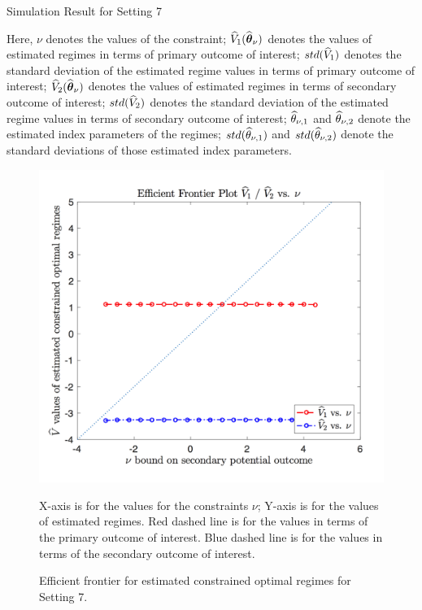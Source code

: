 \begin{table}[!htbp]
	\caption {Simulation Result for Setting 7}
	\centering
	{\tt
		
	}
	\justify
	Here, $\nu$ denotes the values of the constraint; $\widehat{V}_1(\widehat{\boldsymbol{\theta}}_{\nu})$ denotes the values of estimated regimes in terms of primary outcome of interest; $std(\widehat{V}_1)$ denotes the standard deviation of the estimated regime values in terms of primary outcome of interest; $\widehat{V}_2(\widehat{\boldsymbol{\theta}}_{\nu})$ denotes the values of estimated regimes in terms of secondary outcome of interest; $std(\widehat{V}_2)$ denotes the standard deviation of the estimated regime values in terms of secondary outcome of interest; $\widehat{\theta}_{\nu,1}$ and $\widehat{\theta}_{\nu,2}$ denote the estimated index parameters of the regimes; $std(\widehat{\theta}_{\nu,1})$ and $std(\widehat{\theta}_{\nu,2})$ denote the standard deviations of those estimated index parameters.	
\end{table} 
\begin{figure}[!htb]
	\centering
	\includegraphics[width=.9\linewidth]{./Chapter-1/figs/efficient_plot7.png}
	\caption{Efficient frontier for estimated constrained optimal regimes for Setting 7.}
	\label{fig:7}
	\justify
X-axis is for the values for the constraints $\nu$; Y-axis is for the values of estimated regimes. Red dashed line is for the values in terms of the primary outcome of interest. Blue dashed line is for the values in terms of the secondary outcome of interest.
\end{figure}
